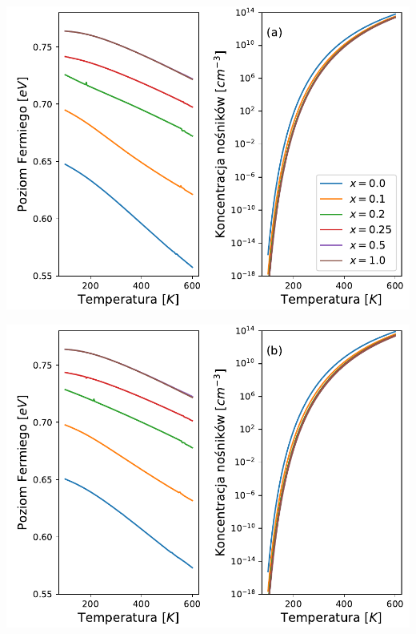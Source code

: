 \documentclass[12pt,openany,a4paper]{book}
\begin{document}
\begin{minipage}[t]{0.5\textwidth}
	\hspace{-0.54cm}
	\includegraphics[width = \linewidth]{Figures/carriers/fermi_L_100.pdf}
\end{minipage}
\begin{minipage}[t]{0.5\textwidth}
	\hspace{-0.54cm}
	\includegraphics[width = \linewidth]{Figures/carriers/fermi_L_200.pdf}
\end{minipage}
\end{document}
